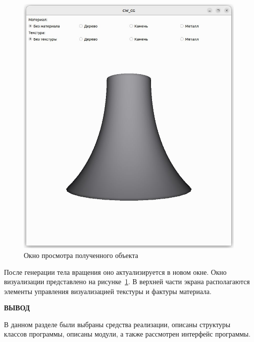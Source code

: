 \begin{figure}[H]
	\centering
	\includegraphics[scale=0.4]{img/inter_2.png}
	\caption{Окно просмотра полученного объекта}
	\label{fig:viewer}
\end{figure}
После генерации тела вращения оно актуализируется в новом окне. Окно визуализации представлено на рисунке~\ref{fig:viewer}. В верхней части экрана располагаются элементы управления визуализацией текстуры и фактуры материала.


\textbf{ВЫВОД}

В данном разделе были выбраны средства реализации, описаны структуры классов программы, описаны модули, а также рассмотрен интерфейс программы.

\clearpage